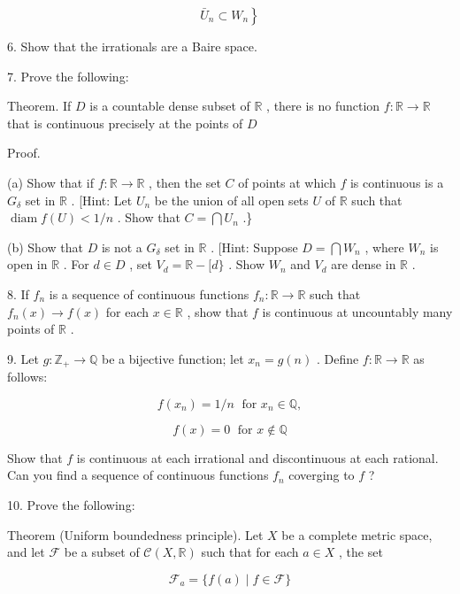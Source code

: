 \[
\left. {{\bar{U}}_{n} \subset  {W}_{n}}\right\}
\]

6. Show that the irrationals are a Baire space.

7. Prove the following:

Theorem. If \(D\) is a countable dense subset of \(\mathbb{R}\) , there is no function \(f : \mathbb{R} \rightarrow  \mathbb{R}\) that is continuous precisely at the points of \(D\)

Proof.

(a) Show that if \(f : \mathbb{R} \rightarrow  \mathbb{R}\) , then the set \(C\) of points at which \(f\) is continuous is a \({G}_{\delta }\) set in \(\mathbb{R}\) . [Hint: Let \({U}_{n}\) be the union of all open sets \(U\) of \(\mathbb{R}\) such that \(\operatorname{diam}f\left( U\right)  < 1/n\) . Show that \(C = \bigcap {U}_{n}\) .\}

(b) Show that \(D\) is not a \({G}_{\delta }\) set in \(\mathbb{R}\) . [Hint: Suppose \(D = \bigcap {W}_{n}\) , where \({W}_{n}\) is open in \(\mathbb{R}\) . For \(d \in  D\) , set \({V}_{d} = \mathbb{R} - \lbrack d\}\) . Show \({W}_{n}\) and \({V}_{d}\) are dense in \(\mathbb{R}\) .

8. If \({f}_{n}\) is a sequence of continuous functions \({f}_{n} : \mathbb{R} \rightarrow  \mathbb{R}\) such that \({f}_{n}\left( x\right)  \rightarrow  f\left( x\right)\) for each \(x \in  \mathbb{R}\) , show that \(f\) is continuous at uncountably many points of \(\mathbb{R}\) .

9. Let \(g : {\mathbb{Z}}_{ + } \rightarrow  \mathbb{Q}\) be a bijective function; let \({x}_{n} = g\left( n\right)\) . Define \(f : \mathbb{R} \rightarrow  \mathbb{R}\) as follows:

\[
f\left( {x}_{n}\right)  = 1/n\;\text{ for }{x}_{n} \in  \mathbb{Q},
\]

\[
f\left( x\right)  = 0\;\text{ for }x \notin  \mathbb{Q}
\]

Show that \(f\) is continuous at each irrational and discontinuous at each rational. Can you find a sequence of continuous functions \({f}_{n}\) coverging to \(f\) ?

10. Prove the following:

Theorem (Uniform boundedness principle). Let \(X\) be a complete metric space, and let \(\mathcal{F}\) be a subset of \(\mathcal{C}\left( {X,\mathbb{R}}\right)\) such that for each \(a \in  X\) , the set

\[
{\mathcal{F}}_{a} = \{ f\left( a\right)  \mid  f \in  \mathcal{F}\}
\]

